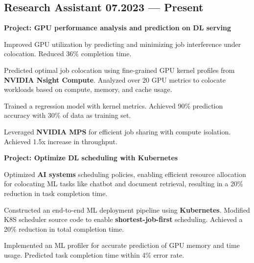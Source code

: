 \subsection{{Research Assistant \hfill 07.2023 --- Present}}

\begin{zitemize}
        \item \textbf{Project: GPU performance analysis and prediction on DL serving}
        \item Improved GPU utilization by predicting and minimizing job interference under colocation. Reduced 36\% completion time.
        \item Predicted optimal job colocation using fine-grained GPU kernel profiles from \textbf{NVIDIA Nsight Compute}. Analyzed over 20 GPU metrics to colocate workloads based on compute, memory, and cache usage.
        \item Trained a regression model with kernel metrics. Achieved 90\% prediction accuracy with 30\% of data as training set.
        \item Leveraged \textbf{NVIDIA MPS} for efficient job sharing with compute isolation. Achieved 1.5x increase in throughput.
\end{zitemize}
\vspace{-1.5pt}
\begin{zitemize}
        \item \textbf{Project: Optimize DL scheduling with Kubernetes}
        \item Optimized \textbf{AI systems} scheduling policies, enabling efficient resource allocation for colocating ML tasks like chatbot and document retrieval, resulting in a 20\% reduction in task completion time.
        \item Constructed an end-to-end ML deployment pipeline using \textbf{Kubernetes}. Modified K8S scheduler source
        code to enable \textbf{shortest-job-first} scheduling. Achieved a 20\% reduction in total completion time.
        \item Implemented an ML profiler for accurate prediction of GPU memory and time usage. Predicted task
completion time within 4\% error rate.
\end{zitemize}

